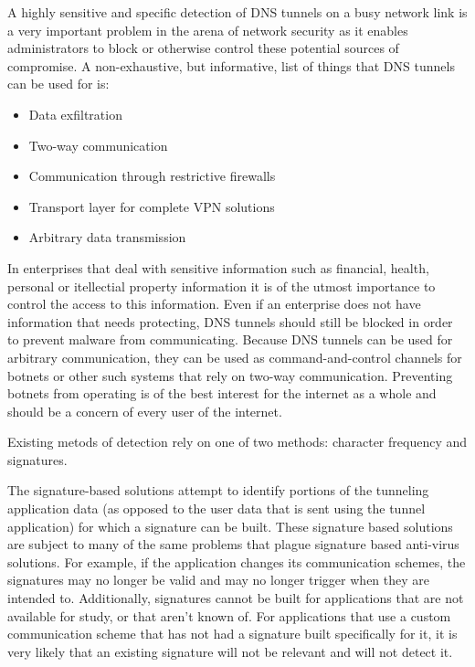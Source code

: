 \documentclass{article}
\theoremstyle{remark}
\theoremstyle{definition}
\theoremstyle{definition}
\theoremstyle{definition}
\begin{document}
A highly sensitive and specific detection of DNS tunnels on a busy network link
is a very important problem in the arena of network security as it enables
administrators to block or otherwise control these potential sources of
compromise. A non-exhaustive, but informative, list of things that DNS tunnels
can be used for is:

\begin{itemize}
\item Data exfiltration
\item Two-way communication
\item Communication through restrictive firewalls
\item Transport layer for complete VPN solutions
\item Arbitrary data transmission
\end{itemize}

In enterprises that deal with sensitive information such as financial, health,
personal or itellectial property information it is of the utmost importance to
control the access to this information. Even if an enterprise does not have
information that needs protecting, DNS tunnels should still be blocked in order
to prevent malware from communicating. Because DNS tunnels can be used for
arbitrary communication, they can be used as command-and-control channels for
botnets or other such systems that rely on two-way communication. Preventing
botnets from operating is of the best interest for the internet as a whole and
should be a concern of every user of the internet.

Existing metods of detection rely on one of two methods: character frequency
and signatures.

The signature-based solutions attempt to identify portions of the tunneling
application data (as opposed to the user data that is sent using the tunnel
application) for which a signature can be built. These signature based
solutions are subject to many of the same problems that plague signature based
anti-virus solutions. For example, if the application changes its communication
schemes, the signatures may no longer be valid and may no longer trigger when
they are intended to. Additionally, signatures cannot be built for applications
that are not available for study, or that aren't known of. For applications
that use a custom communication scheme that has not had a signature built
specifically for it, it is very likely that an existing signature will not be
relevant and will not detect it.
\end{document}
